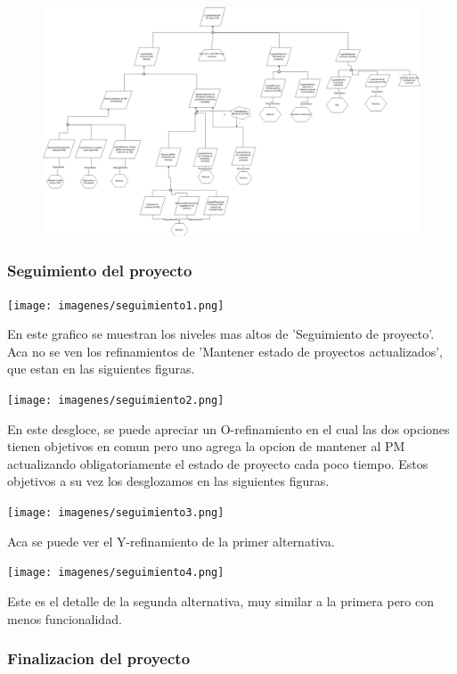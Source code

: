 \begin{figure}[H]
    \centering
    \includegraphics[width=8in, keepaspectratio, angle=90]{imagenes/objetivos-seleccion-mejor-pm.png}
\end{figure}

\subsubsection{Seguimiento del proyecto}

\texttt{[image: imagenes/seguimiento1.png]}

En este grafico se muestran los niveles mas altos de 'Seguimiento de proyecto'. Aca no se ven los refinamientos de 'Mantener estado de proyectos actualizados', que estan en las siguientes figuras.

\texttt{[image: imagenes/seguimiento2.png]}

En este desgloce, se puede apreciar un O-refinamiento en el cual las dos opciones tienen objetivos en comun pero uno agrega la opcion de mantener al PM actualizando obligatoriamente el estado de proyecto cada poco tiempo. Estos objetivos a su vez los desglozamos en las siguientes figuras.

\texttt{[image: imagenes/seguimiento3.png]}

Aca se puede ver el Y-refinamiento de la primer alternativa.

\texttt{[image: imagenes/seguimiento4.png]}

Este es el detalle de la segunda alternativa, muy similar a la primera pero con menos funcionalidad.

\newpage

\subsubsection{Finalizacion del proyecto}

